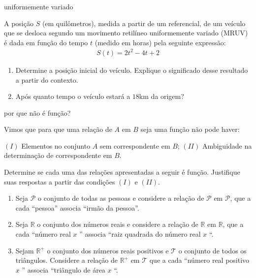 \begin{task}{ uniformemente variado}
\label{\detokenize{AF106-2:atividade-uniformemente-variado}}\label{\detokenize{AF106-2:ativ-funcoes-uniformemente-variado}}

A posição \(S\) (em quilômetros), medida a partir de um referencial, de um veículo que se desloca segundo um movimento retilíneo uniformemente variado (MRUV) é dada em função do tempo \(t\) (medido em horas) pela seguinte expressão:
\begin{equation*}
\begin{split}S(t)=2t^2-4t+2\end{split}
\end{equation*}\begin{enumerate}
\item {} 
Determine a posição inicial do veículo. Explique o significado desse resultado a partir do contexto.

\item {} 
Após quanto tempo o veículo estará a $18$km da origem?

\end{enumerate}
\end{task}

\know{}
\label{\detokenize{AF106-3::doc}}\label{\detokenize{AF106-3:sec-aprofundando}}\label{\detokenize{AF106-3:para-saber-mais}}

\begin{task}{ por que não é função?}
\label{\detokenize{AF106-3:ativ-nao-funcao}}\label{\detokenize{AF106-3:atividade-por-que-nao-e-funcao}}

Vimos que para que uma relação de \(A\) em \(B\) seja uma função não pode haver:

\((I)\) Elementos no conjunto \(A\) sem correspondente em \(B\);
\((II)\) Ambiguidade na determinação de correspondente em \(B\).

Determine se cada uma das relações apresentadas a seguir é função. Justifique suas respostas a partir das condições \((I)\) e \((II)\).
\begin{enumerate}
\item {} 
Seja \(\mathcal{P}\) o conjunto de todas as pessoas e considere a relação de \(\mathcal{P}\) em \(\mathcal{P}\), que a cada “pessoa” associa “irmão da pessoa”.

\item {} 
Seja \(\mathbb{R}\)  o conjunto dos números reais e considere a relação de \(\mathbb{R}\) em \(\mathbb{R}\), que a cada “número real \(x\) ” associa “raiz quadrada do número real \(x\) “.

\item {} 
Sejam \(\mathbb{R}^+\) o conjunto dos números reais positivos e \(\mathcal{T}\) o conjunto de todos os triângulos. Considere a relação de \(\mathbb{R}^+\) em \(\mathcal{T}\) que a cada “número real positivo \(x\) ” associa “triângulo de área \(x\) “.

\end{enumerate}

\end{task}

